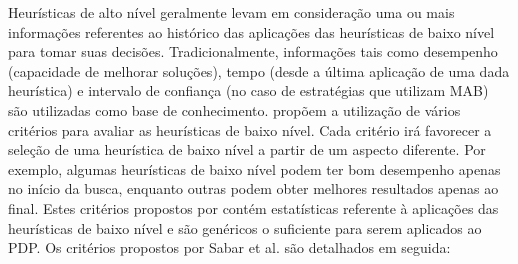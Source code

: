 Heurísticas de alto nível geralmente levam em consideração uma ou mais informações referentes ao histórico das aplicações das heurísticas de baixo nível para tomar suas decisões. Tradicionalmente, informações tais como desempenho (capacidade de melhorar soluções), tempo (desde a última aplicação de uma dada heurística) e intervalo de confiança (no caso de estratégias que utilizam MAB) são utilizadas como base de conhecimento. \cite{sabar2015automatic} propõem a utilização de vários critérios para avaliar as heurísticas de baixo nível. Cada critério irá favorecer a seleção de uma heurística de baixo nível a partir de um aspecto diferente. Por exemplo, algumas heurísticas de baixo nível podem ter bom desempenho apenas no início da busca, enquanto outras podem obter melhores resultados apenas ao final. Estes critérios propostos por \cite{sabar2015automatic} contém estatísticas referente à aplicações das heurísticas de baixo nível e são genéricos o suficiente para serem aplicados ao PDP. Os critérios propostos por Sabar et al. \cite{sabar2015automatic} são detalhados em seguida:


